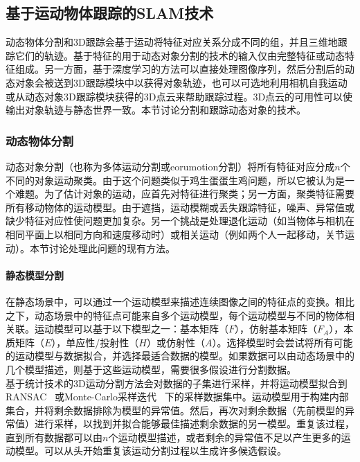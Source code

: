\subsection{基于运动物体跟踪的SLAM技术}
\label{subsec:object_tracking}
\newpage
动态物体分割和3D跟踪会基于运动将特征对应关系分成不同的组，并且三维地跟踪它们的轨迹。基于特征的用于动态对象分割的技术的输入仅由完整特征或动态特征组成。另一方面，基于深度学习的方法可以直接处理图像序列，然后分割后的动态对象会被送到3D跟踪模块中以获得对象轨迹，也可以可选地利用相机自我运动或从动态对象3D跟踪模块获得的3D点云来帮助跟踪过程。3D点云的可用性可以使输出对象轨迹与静态世界一致。本节讨论分割和跟踪动态对象的技术。

\subsubsection{动态物体分割}
动态对象分割（也称为多体运动分割或eorumotion分割）将所有特征对应分成$n$个不同的对象运动聚类。由于这个问题类似于鸡生蛋蛋生鸡问题，所以它被认为是一个难题。为了估计对象的运动，应首先对特征进行聚类；另一方面，聚类特征需要所有移动物体的运动模型。由于遮挡，运动模糊或丢失跟踪特征，噪声、异常值或缺少特征对应性使问题更加复杂。另一个挑战是处理退化运动（如当物体与相机在相同平面上以相同方向和速度移动时）或相关运动（例如两个人一起移动，关节运动）。本节讨论处理此问题的现有方法。

\paragraph{静态模型分割}
在静态场景中，可以通过一个运动模型来描述连续图像之间的特征点的变换。相比之下，动态场景中的特征点可能来自多个运动模型，每个运动模型与不同的物体相关联。运动模型可以基于以下模型之一：基本矩阵（$F$），仿射基本矩阵（$F_A$），本质矩阵（$E$），单应性/投射性（$H$）或仿射性（$A$）。选择模型时会尝试将所有可能的运动模型与数据拟合，并选择最适合数据的模型。如果数据可以由动态场景中的几个模型描述，则基于这些运动模型，需要很多假设进行分割数据。\\

基于统计技术的3D运动分割方法会对数据的子集进行采样，并将运动模型拟合到RANSAC~\cite{fischler1981random}
或Monte-Carlo采样迭代~\cite{schindler2006two}
下的采样数据集中。运动模型用于构建内部集合，并将剩余数据排除为模型的异常值。然后，再次对剩余数据（先前模型的异常值）进行采样，以找到并拟合能够最佳描述剩余数据的另一模型。重复该过程，直到所有数据都可以由$n$个运动模型描述，或者剩余的异常值不足以产生更多的运动模型。可以从头开始重复该运动分割过程以生成许多候选假设。\\

